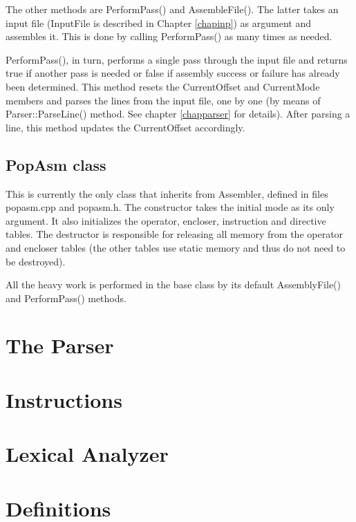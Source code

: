 \documentclass[a4paper,draft,12pt]{book}
\begin{document}
The other methods are PerformPass() and AssembleFile(). The latter takes an
input file (InputFile is described in Chapter \ref{chapinp}) as argument and
assembles it. This is done by calling PerformPass() as many times as needed.

PerformPass(), in turn, performs a single pass through the input file and
returns true if another pass is needed or false if assembly success or failure
has already been determined. This method resets the CurrentOffset and CurrentMode
members and parses the lines from the input file, one by one (by means of
Parser::ParseLine() method. See chapter \ref{chapparser} for details). After
parsing a line, this method updates the CurrentOffset accordingly.

\section{PopAsm class}
This is currently the only class that inherits from Assembler, defined in
files popasm.cpp and popasm.h. The constructor takes the initial mode as
its only argument. It also initializes the operator, encloser, instruction
and directive tables. The destructor is responsible for releasing all memory
from the operator and encloser tables (the other tables use static memory and
thus do not need to be destroyed).

All the heavy work is performed in the base class by its default AssemblyFile()
and PerformPass() methods.

\chapter{The Parser\label{chapparser}}

\chapter{Instructions\label{chapinst}}








\chapter{Lexical Analyzer\label{chaplex}}

\chapter{Definitions\label{chaprefs}}
\end{document}
